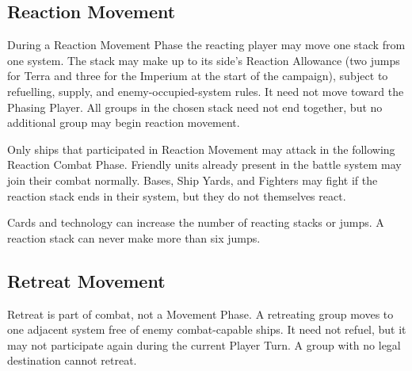 \subsection{Reaction Movement}

During a Reaction Movement Phase the reacting player may move one stack from
one system. The stack may make up to its side's Reaction Allowance (two jumps
for Terra and three for the Imperium at the start of the campaign), subject to
refuelling, supply, and enemy-occupied-system rules. It need not move toward the Phasing Player.
All groups in the chosen stack need not end together, but no additional group
may begin reaction movement.

Only ships that participated in Reaction Movement may attack in the following
Reaction Combat Phase. Friendly units already present in the battle system may
join their combat normally. Bases, Ship Yards, and Fighters may fight if the
reaction stack ends in their system, but they do not themselves react.

Cards and technology can increase the number of reacting stacks or jumps. A
reaction stack can never make more than six jumps.

\subsection{Retreat Movement}

Retreat is part of combat, not a Movement Phase. A retreating group moves to
one adjacent system free of enemy combat-capable ships. It need not refuel, but
it may not participate again during the current Player Turn. A group with no
legal destination cannot retreat.
